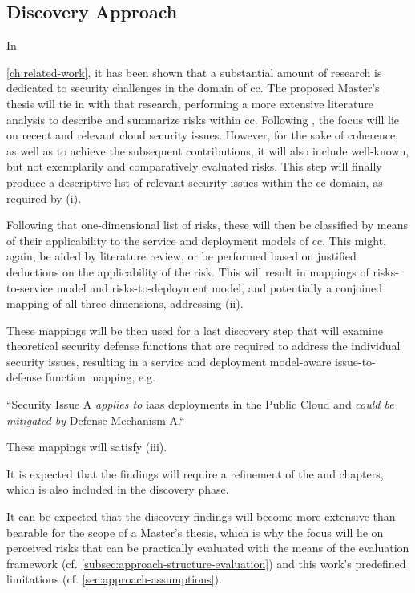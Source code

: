 	\subsection{Discovery Approach} \label{sec:approach-structure-discovery}
	
	In {\autoref{ch:related-work}, it has been shown that a substantial amount of research is dedicated to security challenges in the domain of \ac{cc}. The proposed Master's thesis will tie in with that research, performing a more extensive literature analysis to describe and summarize risks within \ac{cc}. Following , the focus will lie on recent and relevant cloud security issues. However, for the sake of coherence, as well as to achieve the subsequent contributions, it will also include well-known, but not exemplarily and comparatively evaluated risks. This step will finally produce a descriptive list of relevant security issues within the \ac{cc} domain, as required by  (i). 	
	
	Following that one-dimensional list of risks, these will then be classified by means of their applicability to the service and deployment models of \ac{cc}. This might, again, be aided by literature review, or be performed based on justified deductions on the applicability of the risk. This will result in mappings of risks-to-service model and risks-to-deployment model, and potentially a conjoined mapping of all three dimensions, addressing  (ii). 
	
	These mappings will be then used for a last discovery step that will examine theoretical security defense functions that are required to address the individual security issues, resulting in a service and deployment model-aware issue-to-defense function mapping, e.g.
	
	\begin{center}
		``Security Issue A \textit{applies to} \ac{iaas} deployments in the Public Cloud and \textit{could be mitigated by} Defense Mechanism A.``\\
	\end{center}
	
	These mappings will satisfy  (iii).
	
	It is expected that the findings will require a refinement of the  and  chapters, which is also included in the discovery phase. 
		
	It can be expected that the discovery findings will become more extensive than bearable for the scope of a Master's thesis, which is why the focus will lie on perceived risks that can be practically evaluated with the means of the evaluation framework (cf. \autoref{subsec:approach-structure-evaluation}) and this work's predefined limitations (cf. \autoref{sec:approach-assumptions}).
	
}
